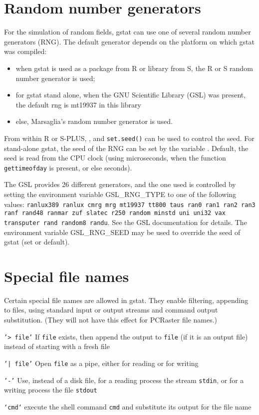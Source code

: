 \documentclass[a4paper,12pt]{book}
\newcommand{\code}[1]{\texttt{#1}}
\newcommand{\iskey}[1]{\htmlref{\code{{#1}}}{key:#1}}
\newenvironment{codelist}{%
\begin{description}\setlength{\labelsep}{0.5cm}}{%
\end{description}}
\begin{document}
\section{Random number generators}
\label{sec:rng}

For the simulation of random fields, gstat can use one of several random
number generators (RNG). The default generator depends on the platform
on which gstat was compiled:
\begin{itemize}
\item when gstat is used as a package from R or library from S, the
R or S random number generator is used;
\item for gstat stand alone, 
when the GNU Scientific Library (GSL) was present, the default
rng is mt19937 in this library
\item else, Marsaglia's random number generator is used.
\end{itemize}

From within R or S-PLUS, , and {\tt set.seed()} can be used to control
the seed. For stand-alone gstat, the seed of the RNG can be set by the
variable \iskey{seed}. Default, the seed is read from the CPU clock
(using microseconds, when the function {\tt gettimeofday} is present,
or else seconds). 

The GSL provides 26 different generators, and the one used is controlled
by setting the environment variable GSL\_RNG\_TYPE to one of the following
values: {\tt ranlux389 ranlux cmrg mrg mt19937 tt800 taus ran0 ran1
ran2 ran3 ranf rand48 ranmar zuf slatec r250 random minstd uni uni32 vax
transputer rand random8 randu}. See the GSL documentation for details.
The environment variable GSL\_RNG\_SEED may be used to override the seed
of gstat (set or default).

\section{Special file names}
\label{sec:filen}

Certain special file names are allowed in gstat. They enable filtering,
appending to files, using standard input or output streams and command
output substitution. (They will not have this effect for PCRaster
file names.)

\begin{codelist}
\item[\code{'> file'}]
If \code{file} exists, then append the output to \code{file} (if it is
an output file) instead of starting with a fresh file

\item[\code{'| file'}]
Open \code{file} as a pipe, either for reading or for writing

\item[\code{'-'}]
Use, instead of a disk file, for a reading process the stream
\code{stdin}, or for a writing process the file \code{stdout}

\item[\code{`cmd`}]
execute the shell command \code{cmd} and substitute its output for the
file name

\end{codelist}
\end{document}
